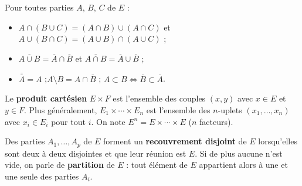 \begin{propriete}
Pour toutes parties $A$, $B$, $C$ de $E$ :
\begin{itemize}[label={\color{otNavy}\textbullet},leftmargin=1.4em,itemsep=0.6mm,topsep=0.8mm]
  \item {} $A\cap(B\cup C)=(A\cap B)\cup(A\cap C)$ et
    $A\cup(B\cap C)=(A\cup B)\cap(A\cup C)$ ;
  \item {} $\overline{A\cup B}=\overline{A}\cap\overline{B}$
    et $\overline{A\cap B}=\overline{A}\cup\overline{B}$ ;
  \item $\overline{\overline{A}}=A$ ;\quad $A\setminus B=A\cap\overline{B}$ ;\quad
    $A\subset B\iff\overline{B}\subset\overline{A}$.
\end{itemize}
\end{propriete}

\begin{definition}
Le \textbf{produit cartésien} $E\times F$ est l'ensemble des couples $(x,y)$
avec $x\in E$ et $y\in F$. Plus généralement, $E_1\times\cdots\times E_n$ est
l'ensemble des $n$-uplets $(x_1,\dots,x_n)$ avec $x_i\in E_i$ pour tout $i$.
On note $E^{n}=E\times\cdots\times E$ ($n$ facteurs).
\end{definition}

\noindent
\begin{minipage}[c]{0.58\linewidth}
\begin{definition}
Des parties $A_1,\dots,A_p$ de $E$ forment un \textbf{recouvrement disjoint}
de $E$ lorsqu'elles sont deux à deux disjointes et que leur réunion est $E$.
Si de plus aucune n'est vide, on parle de \textbf{partition} de $E$ : tout
élément de $E$ appartient alors à une et une seule des parties $A_i$.
\end{definition}
\end{minipage}\hfill
\begin{minipage}[c]{0.38\linewidth}
\centering
{}\\[0.5mm]
\end{minipage}

